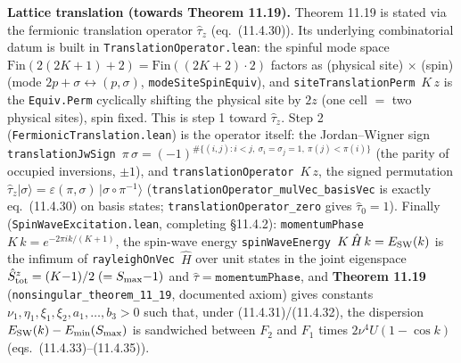 \documentclass[a4paper,11pt]{article}
\begin{document}
\medskip\noindent\textbf{Lattice translation (towards Theorem 11.19).}  Theorem 11.19 is
stated via the fermionic translation operator $\hat\tau_z$ (eq.~(11.4.30)).  Its underlying
combinatorial datum is built in \texttt{TranslationOperator.lean}: the spinful mode space
$\mathrm{Fin}(2(2K{+}1){+}2)=\mathrm{Fin}((2K{+}2)\cdot 2)$ factors as (physical site)
$\times$ (spin) (mode $2p{+}\sigma\leftrightarrow(p,\sigma)$, \texttt{modeSiteSpinEquiv}), and
\texttt{siteTranslationPerm}~$K\,z$ is the \texttt{Equiv.Perm} cyclically shifting the
physical site by $2z$ (one cell $=$ two physical sites), spin fixed.  This is step 1 toward
$\hat\tau_z$.  Step 2 (\texttt{FermionicTranslation.lean}) is the operator itself: the
Jordan--Wigner sign \texttt{translationJwSign}~$\pi\,\sigma = (-1)^{\#\{(i,j):i<j,\ \sigma_i=\sigma_j=1,\ \pi(j)<\pi(i)\}}$
(the parity of occupied inversions, $\pm1$), and \texttt{translationOperator}~$K\,z$, the
signed permutation $\hat\tau_z|\sigma\rangle = \varepsilon(\pi,\sigma)\,|\sigma\circ\pi^{-1}\rangle$
(\texttt{translationOperator\_mulVec\_basisVec} is exactly eq.~(11.4.30) on basis states;
\texttt{translationOperator\_zero} gives $\hat\tau_0=1$).  Finally
(\texttt{SpinWaveExcitation.lean}, completing §11.4.2): \texttt{momentumPhase}~$K\,k =
e^{-2\pi i k/(K+1)}$, the spin-wave energy \texttt{spinWaveEnergy}~$K\,\hat H\,k = E_{\rm SW}(k)$
is the infimum of \texttt{rayleighOnVec}~$\hat H$ over unit states in the joint eigenspace
$\hat S^z_{\rm tot}=(K{-}1)/2\;(=S_{\max}{-}1)$ and $\hat\tau=\texttt{momentumPhase}$, and
\textbf{Theorem 11.19} (\texttt{nonsingular\_theorem\_11\_19}, documented axiom) gives constants
$\nu_1,\eta_1,\xi_1,\xi_2,a_1,\dots,b_3>0$ such that, under (11.4.31)/(11.4.32), the dispersion
$E_{\rm SW}(k)-E_{\min}(S_{\max})$ is sandwiched between $F_2$ and $F_1$ times
$2\nu^4 U(1-\cos k)$ (eqs.~(11.4.33)--(11.4.35)).
\end{document}
